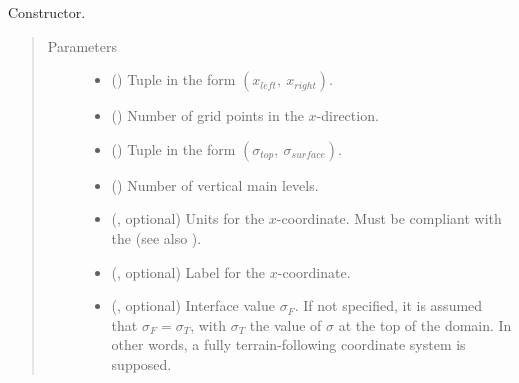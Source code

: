 \documentclass[letterpaper,10pt,english]{sphinxmanual}
\begin{document}
\begin{fulllineitems}
\begin{quote}
\begin{description}
\begin{itemize}
\end{itemize}

\end{description}\end{quote}

\begin{fulllineitems}
\label{\detokenize{api:grids.sigma.Sigma2d.__init__}}
Constructor.
\begin{quote}\begin{description}
\item[{Parameters}] \leavevmode\begin{itemize}
\item {} 
 () \textendash{} Tuple in the form \((x_{left}, ~ x_{right})\).

\item {} 
 () \textendash{} Number of grid points in the \(x\)-direction.

\item {} 
 () \textendash{} Tuple in the form \((\sigma_{top}, ~ \sigma_{surface})\).

\item {} 
 () \textendash{} Number of vertical main levels.

\item {} 
 (, optional) \textendash{} 
Units for the \(x\)-coordinate. Must be compliant with the 
(see also {\hyperref[\detokenize{api:grids.axis.Axis.__init__}]{}}).


\item {} 
 (, optional) \textendash{} Label for the \(x\)-coordinate.

\item {} 
 (, optional) \textendash{} Interface value \(\sigma_F\). If not specified, it is assumed that \(\sigma_F = \sigma_T\),
with \(\sigma_T\) the value of \(\sigma\) at the top of the domain. In other words, a fully
terrain-following coordinate system is supposed.


\end{itemize}
\end{description}
\end{quote}
\end{fulllineitems}
\end{fulllineitems}
\end{document}
